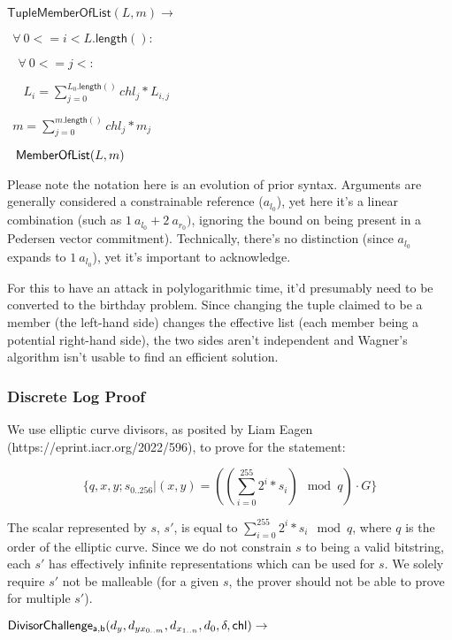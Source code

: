 \documentclass[]{article}
\begin{document}
\newcommand{\tuplememberlist}{\mathsf{TupleMemberOfList}}

$\tuplememberlist(L, m) \rightarrow$

$~~\forall ~0 <= i < L\mathsf{.length}():$

$~~~~\forall ~0 <= j < :$

$~~~~~~L_i = \sum^{L_0\mathsf{.length}()}_{j=0} chl_j * L_{i,j}$

$~~m = \sum^{m\mathsf{.length}()}_{j=0} chl_j * m_j$

$~~\mathsf{MemberOfList}(L, m)$

Please note the notation here is an evolution of prior syntax. Arguments are generally considered a constrainable reference ($a_{l_0}$), yet here it's a linear combination (such as $1 ~a_{l_0} + 2 ~a_{r_0})$, ignoring the bound on being present in a Pedersen vector commitment). Technically, there's no distinction (since $a_{l_0}$ expands to $1 ~a_{l_0}$), yet it's important to acknowledge.

For this to have an attack in polylogarithmic time, it'd presumably need to be converted to the birthday problem. Since changing the tuple claimed to be a member (the left-hand side) changes the effective list (each member being a potential right-hand side), the two sides aren't independent and Wagner's algorithm isn't usable to find an efficient solution.

\newpage

\subsubsection{Discrete Log Proof}

We use elliptic curve divisors, as posited by Liam Eagen (https://eprint.iacr.org/2022/596), to prove for the statement:

$$
\{ q, x, y; s_{0..256} | (x, y) = ((\sum^{255}_{i=0} 2^i * s_i) \mod q) \cdot G \}
$$

The scalar represented by $s$, $s'$, is equal to $\sum^{255}_{i=0} 2^i * s_i \mod q$, where $q$ is the order of the elliptic curve. Since we do not constrain $s$ to being a valid bitstring, each $s'$ has effectively infinite representations which can be used for $s$. We solely require $s'$ not be malleable (for a given $s$, the prover should not be able to prove for multiple $s'$).

\newcommand{\dloglhs}{\mathsf{DivisorChallenge_{a,b}}}

$\dloglhs(d_y, d_{yx_{0..m}}, d_{x_{1..n}}, d_0, \delta, \chl) \rightarrow$
\end{document}
